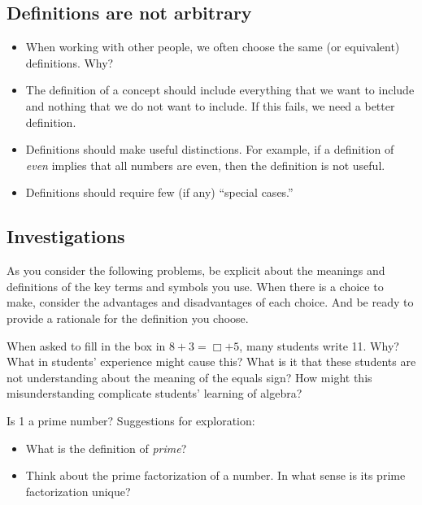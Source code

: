 \documentclass[space,nooutcomes]{ximera}
\begin{document}
\subsection*{Definitions are not arbitrary}
\begin{itemize}
\item When working with other people, we often choose the same (or equivalent) definitions.  Why?  
\item The definition of a concept should include everything that we want to include and nothing that we do not want to include.  If this fails, we need a better definition.  
\item Definitions should make useful distinctions.  For example, if a definition of \emph{even} implies that all numbers are even, then the definition is not useful.
\item Definitions should require few (if any) ``special cases.''  
\end{itemize}

\subsection*{Investigations}
As you consider the following problems, be explicit about the meanings and definitions of the key terms and symbols you use.  When there is a choice to make, consider the advantages and disadvantages of each choice.  And be ready to provide a rationale for the definition you choose.  

\begin{problem}
When asked to fill in the box in  $8 + 3 = \Box + 5$, many students write 11.  Why?  What in students' experience might cause this?  What is it that these students are not understanding about the meaning of the equals sign?  How might this misunderstanding complicate students' learning of algebra?  
\end{problem}

\begin{problem}
Is 1 a prime number?  Suggestions for exploration:  
\begin{itemize}
\item What is the definition of \emph{prime}?  
\item Think about the prime factorization of a number.  In what sense is its prime factorization unique?  
\end{itemize}
\end{problem}
\end{document}
